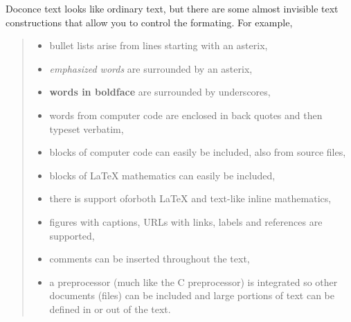 \documentclass[a4paper,english]{article}
\begin{document}
Doconce text looks like ordinary text, but there are some almost invisible
text constructions that allow you to control the formating. For example,
%
\begin{quote}
%
\begin{itemize}

\item bullet lists arise from lines starting with an asterix,

\item \emph{emphasized words} are surrounded by an asterix,

\item \textbf{words in boldface} are surrounded by underscores,

\item words from computer code are enclosed in back quotes and
then typeset verbatim,

\item blocks of computer code can easily be included, also from source files,

\item blocks of LaTeX mathematics can easily be included,

\item there is support oforboth LaTeX and text-like inline mathematics,

\item figures with captions, URLs with links, labels and references
are supported,

\item comments can be inserted throughout the text,

\item a preprocessor (much like the C preprocessor) is integrated so
other documents (files) can be included and large portions of text
can be defined in or out of the text.

\end{itemize}

\end{quote}
\end{document}

